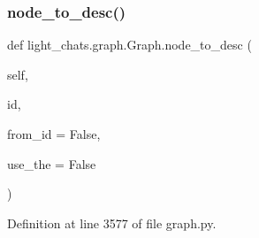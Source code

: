 \subsubsection{\texorpdfstring{node\+\_\+to\+\_\+desc()}{node\_to\_desc()}}
{\footnotesize\ttfamily def light\+\_\+chats.\+graph.\+Graph.\+node\+\_\+to\+\_\+desc (\begin{DoxyParamCaption}\item[{}]{self,  }\item[{}]{id,  }\item[{}]{from\+\_\+id = {\ttfamily False},  }\item[{}]{use\+\_\+the = {\ttfamily False} }\end{DoxyParamCaption})}



Definition at line 3577 of file graph.\+py.


